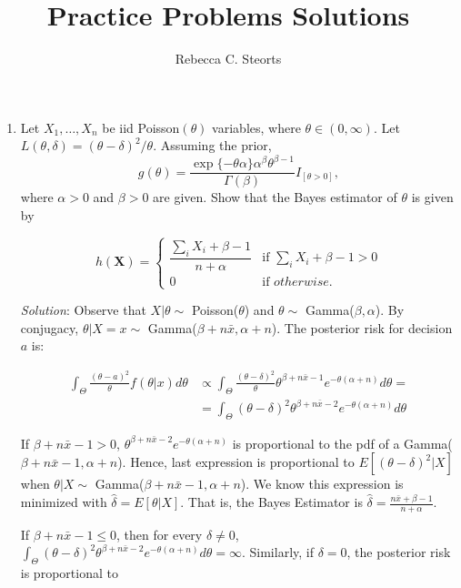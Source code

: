 \documentclass[11pt]{article}
\begin{document}
\title{Practice Problems Solutions}
\author{Rebecca C. Steorts}
\maketitle
\setlength{\parindent}{0cm}
\thispagestyle{empty}
\begin{enumerate}


\item Let $X_1, \ldots, X_n$ be iid Poisson$(\theta)$ variables, where $\theta \in (0,\infty).$ Let 
$L(\theta,\delta) = (\theta - \delta)^2/\theta.$ Assuming the prior,
$$g(\theta) = \frac{\exp\{-
\theta\alpha
\}
\alpha^{\beta}\theta^{\beta-1}
}
{
\Gamma(\beta)
}I_{[\theta > 0]},
$$
where $\alpha>0$ and $\beta>0$ are given. Show that the Bayes estimator of $\theta$ is given by 

$$h(\bm{X}) =
\begin{cases}  \dfrac{\sum_iX_i + \beta - 1}{n + \alpha} &\mbox{if }\sum_iX_i + \beta - 1 > 0 \\
0 & \mbox{if } otherwise. \end{cases} 
$$

\emph{Solution}: Observe that $X|\theta \sim$ Poisson($\theta$) and $\theta \sim$ Gamma($\beta,\alpha$). By conjugacy, $\theta|X=x \sim$ Gamma($\beta+n\bar{x},\alpha+n$). The posterior risk for decision $a$ is:

\begin{align*}
	\int_{\Theta}{\frac{(\theta-a)^{2}}{\theta} f(\theta|x) d\theta}	&\propto \int_{\Theta}{\frac{(\theta-\delta)^{2}}{\theta} \theta^{\beta+n\bar{x}-1}e^{-\theta(\alpha+n)} d\theta} = \\
																																		&= \int_{\Theta}{(\theta-\delta)^{2} \theta^{\beta+n\bar{x}-2}e^{-\theta(\alpha+n)} d\theta}
\end{align*}

If $\beta+n\bar{x}-1 > 0$, $\theta^{\beta+n\bar{x}-2}e^{-\theta(\alpha+n)}$ is proportional to the pdf of a Gamma($\beta+n\bar{x}-1,\alpha+n$). Hence, last expression is proportional to $E[(\theta-\delta)^{2}|X]$ when $\theta|X \sim$ Gamma($\beta+n\bar{x}-1,\alpha+n$). We know this expression is minimized with $\hat{\delta} = E[\theta|X]$. That is, the Bayes Estimator is $\hat{\delta} = \frac{n\bar{x}+\beta-1}{n+\alpha}$.

If $\beta+n\bar{x}-1 \leq 0$, then for every $\delta \neq 0$, $\int_{\Theta}{(\theta-\delta)^{2} \theta^{\beta+n\bar{x}-2}e^{-\theta(\alpha+n)} d\theta} = \infty$. Similarly, if $\delta=0$, the posterior risk is proportional to


\end{enumerate}
\end{document}
